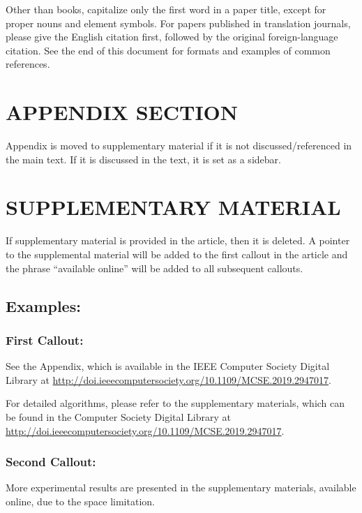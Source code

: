 \documentclass{IEEEcsmag}
\begin{document}
Other than books, capitalize only the first word in a paper title, except for proper nouns and element symbols. For papers published in translation journals, please give the English citation first, followed by the original foreign-language citation. See the end of this document for formats and examples of common references.\vspace*{4pt}

\section{APPENDIX SECTION}

 Appendix is moved to supplementary material if it is not discussed/referenced in the main text. If it is discussed in the text, it is set as a sidebar.  


\section{SUPPLEMENTARY MATERIAL}

If supplementary material is provided in the article, then it is deleted. A pointer to the supplemental material will be added to the first callout in the article and the phrase “available online” will be added to all subsequent callouts.

\subsection{Examples:}
\subsubsection{First Callout:} 

See the Appendix, which is available in the IEEE Computer Society Digital Library at \url{http://doi.ieeecomputersociety.org/10.1109/MCSE.2019.2947017}.

For detailed algorithms, please refer to the supplementary materials, which can be found in the Computer Society Digital Library at \url{http://doi.ieeecomputersociety.org/10.1109/MCSE.2019.2947017}.\vspace*{-8pt}

\subsubsection{Second Callout:}

More experimental results are presented in the supplementary materials, available online, due to the space limitation.\vspace*{-8pt}
\end{document}
